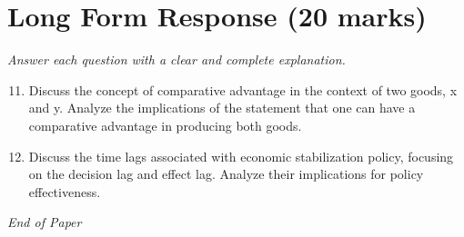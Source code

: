\documentclass[12pt]{article}
\begin{document}
\section*{Long Form Response (20 marks)}
\textit{Answer each question with a clear and complete explanation.}
\begin{enumerate}[label=\arabic*.]
\setcounter{enumi}{10}
\item Discuss the concept of comparative advantage in the context of two goods, x and y. Analyze
the implications of the statement that one can have a comparative advantage in producing
both goods.
\item Discuss the time lags associated with economic stabilization policy, focusing on the
decision lag and effect lag. Analyze their implications for policy effectiveness.
\end{enumerate}

\vfill
\noindent\textit{End of Paper}
\end{document}
